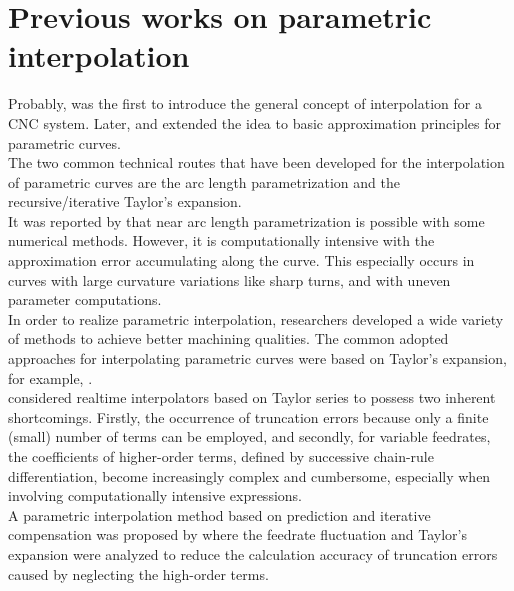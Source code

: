 \clearpage
\pagebreak

\section{Previous works on parametric interpolation}


Probably, \cite{Koren:1976} was the first to introduce the general concept of interpolation for a {CNC} system.  Later, \cite{Koren-etal:1993} and \cite{Shpitalni-etal:1994} extended the idea to basic approximation principles for parametric curves. \\

The two common technical routes that have been developed for the interpolation of parametric curves are the arc length parametrization and the recursive/iterative Taylor's expansion. \\

It was reported by \cite{Farouki-etal:2001} that near arc length parametrization is possible with some numerical methods. However, it is computationally intensive with the approximation error accumulating along the curve. This especially occurs in curves with large curvature variations like sharp turns, and with uneven parameter computations.\\

In order to realize parametric interpolation, researchers developed a wide variety of methods to achieve better machining qualities. The common adopted approaches for interpolating parametric curves were based on Taylor’s expansion, for example, \cite{Cheng-etal:2002}.\\

\cite{Farouki:2021} considered realtime interpolators based on Taylor series to possess two inherent shortcomings. Firstly, the occurrence of truncation errors because only a finite (small) number of terms can be employed, and secondly, for variable feedrates, the coefficients of higher-order terms, defined by successive chain-rule differentiation, become increasingly complex and cumbersome, especially when involving computationally intensive expressions.\\

A parametric interpolation method based on prediction and iterative compensation was proposed by \cite{Ni-etal:2019} where the feedrate fluctuation and Taylor’s expansion were analyzed to reduce the calculation accuracy of truncation errors caused by neglecting the high-order terms. \\

